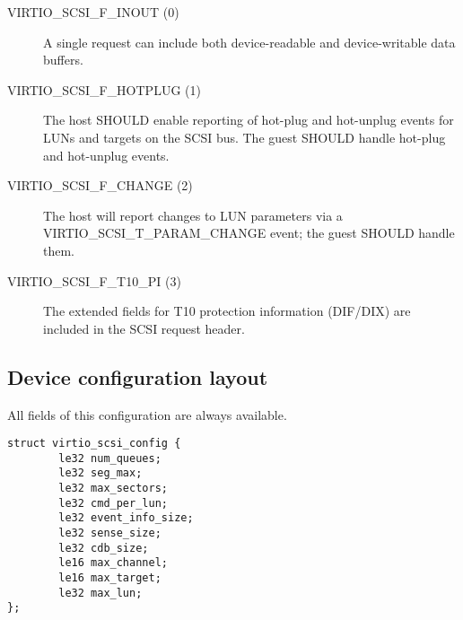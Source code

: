 \begin{description}
\item[VIRTIO_SCSI_F_INOUT (0)] A single request can include both
    device-readable and device-writable data buffers.

\item[VIRTIO_SCSI_F_HOTPLUG (1)] The host SHOULD enable reporting of
    hot-plug and hot-unplug events for LUNs and targets on the SCSI bus.
    The guest SHOULD handle hot-plug and hot-unplug events.

\item[VIRTIO_SCSI_F_CHANGE (2)] The host will report changes to LUN
    parameters via a VIRTIO_SCSI_T_PARAM_CHANGE event; the guest
    SHOULD handle them.

\item[VIRTIO_SCSI_F_T10_PI (3)] The extended fields for T10 protection
    information (DIF/DIX) are included in the SCSI request header.
\end{description}

\subsection{Device configuration layout}\label{sec:Device Types / SCSI Host Device / Device configuration layout}

  All fields of this configuration are always available.

\begin{lstlisting}
struct virtio_scsi_config {
        le32 num_queues;
        le32 seg_max;
        le32 max_sectors;
        le32 cmd_per_lun;
        le32 event_info_size;
        le32 sense_size;
        le32 cdb_size;
        le16 max_channel;
        le16 max_target;
        le32 max_lun;
};
\end{lstlisting}

